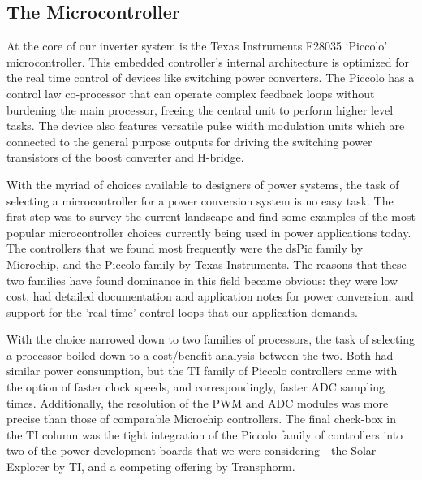 
\subsection{The Microcontroller}
At the core of our inverter system is the Texas Instruments F28035 `Piccolo' microcontroller. This embedded controller's internal architecture is optimized for the real time control of devices like switching power converters. The Piccolo has a control law co-processor that can operate complex feedback loops without burdening the main processor, freeing the central unit to perform higher level tasks. The device also features versatile pulse width modulation units which are connected to the general purpose outputs for driving the switching power transistors of the boost converter and H-bridge. 

With the myriad of choices available to designers of power systems, the task of selecting a microcontroller for a power conversion system is no easy task. The first step was to survey the current landscape and find some examples of the most popular microcontroller choices currently being used in power applications today. The controllers that we found most frequently were the dsPic family by Microchip, and the Piccolo family by Texas Instruments. The reasons that these two families have found dominance in this field became obvious: they were low cost, had detailed documentation and application notes for power conversion, and support for the 'real-time' control loops that our application demands.

With the choice narrowed down to two families of processors, the task of selecting a processor boiled down to a cost/benefit analysis between the two. Both had similar power consumption, but the TI family of Piccolo controllers came with the option of faster clock speeds, and correspondingly, faster ADC sampling times. Additionally, the resolution of the PWM and ADC modules was more precise than those of comparable Microchip controllers. The final check-box in the TI column was the tight integration of the Piccolo family of controllers into two of the power development boards that we were considering - the Solar Explorer by TI, and a competing offering by Transphorm. 

